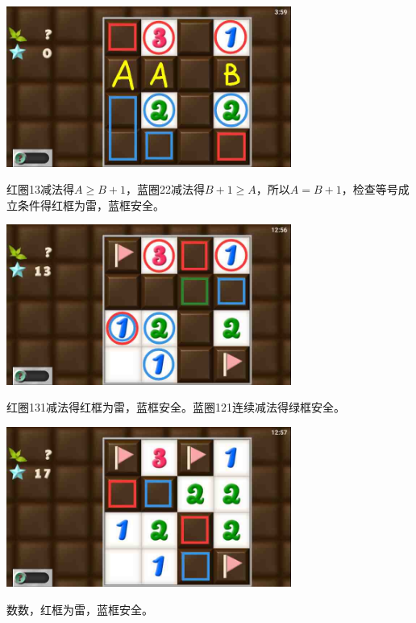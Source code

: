 \subsection{} %
\begin{center}
    \includegraphics[width=0.7\textwidth]{puzzlelow/138-1.jpg}
\end{center}
红圈13减法得$A\ge B+1$，蓝圈22减法得$B+1\ge A$，所以$A=B+1$，检查等号成立条件得红框为雷，蓝框安全。
\begin{center}
    \includegraphics[width=0.7\textwidth]{puzzlelow/138-2.jpg}
\end{center}
红圈131减法得红框为雷，蓝框安全。蓝圈121连续减法得绿框安全。
\begin{center}
    \includegraphics[width=0.7\textwidth]{puzzlelow/138-3.jpg}
\end{center}
数数，红框为雷，蓝框安全。

